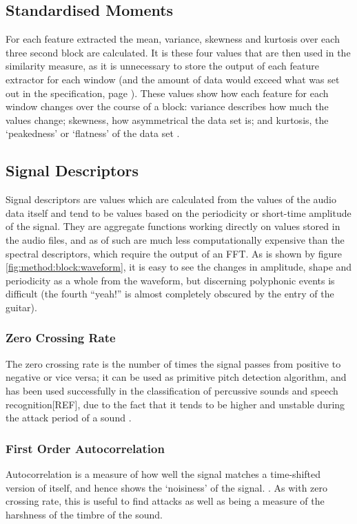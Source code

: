 \subsection{Standardised Moments}
For each feature extracted the mean, variance, skewness and kurtosis over each three second block are calculated. It is these four values that are then used in the similarity measure, as it is unnecessary to store the output of each feature extractor for each window (and the amount of data would exceed what was set out in the specification, page \pageref{text:spec:requirement:data}). These values show how each feature for each window changes over the course of a block: variance describes how much the values change; skewness, how asymmetrical the data set is; and kurtosis, the `peakedness' or `flatness' of the data set \citep{Siegrist2007}.
\subsection{Signal Descriptors}
Signal descriptors are values which are calculated from the values of the audio data itself and tend to be values based on the periodicity or short-time amplitude of the signal. They are aggregate functions working directly on values stored in the audio files, and as of such are much less computationally expensive than the spectral descriptors, which require the output of an FFT. As is shown by figure \ref{fig:method:block:waveform}, it is easy to see the changes in amplitude, shape and periodicity as a whole from the waveform, but discerning polyphonic events is difficult (the fourth ``yeah!'' is almost completely obscured by the entry of the guitar).
\subsubsection{Zero Crossing Rate}

The zero crossing rate is the number of times the signal passes from positive to negative or vice versa; it can be used as primitive pitch detection algorithm, and has been used successfully in the classification of percussive sounds \citep{Gouyon2000} and speech recognition[REF], due to the fact that it tends to be higher and unstable during the attack period of a sound \citep{Schwarz2004}.
\subsubsection{First Order Autocorrelation}

Autocorrelation is a measure of how well the signal matches a time-shifted version of itself, and hence shows the `noisiness' of the signal. \citep{Wikipedia2007}. As with zero crossing rate, this is useful to find attacks as well as being a measure of the harshness of the timbre of the sound.
